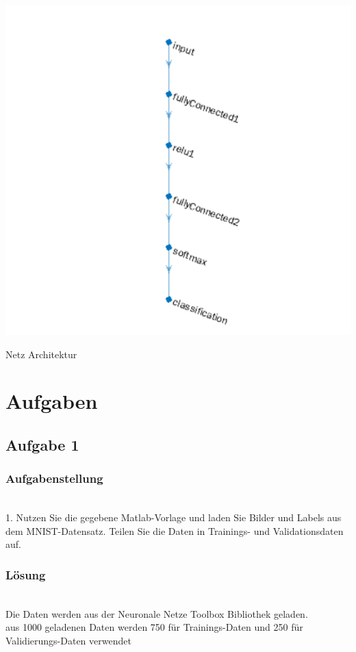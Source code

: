 \documentclass[8pt,a4paper]{article}
\begin{document}
\begin{center}
    

    \includegraphics[scale = 0.4]{model.png}
    \caption{Netz Architektur}
\end{center}


\section{Aufgaben}
\subsection{Aufgabe 1}
\subsubsection{Aufgabenstellung}
\\
1. Nutzen Sie die gegebene Matlab-Vorlage und laden Sie Bilder und Labels aus dem MNIST-Datensatz. Teilen Sie die Daten in Trainings- und
Validationsdaten auf.
\\
\subsubsection{Lösung}
\\
Die Daten werden aus der Neuronale Netze Toolbox Bibliothek geladen.\\
aus 1000 geladenen Daten werden 750 für Trainings-Daten und 250 für Validierungs-Daten verwendet
\end{document}
